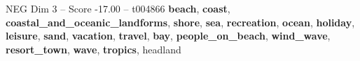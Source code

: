 \begin{textsample}{NEG Dim 3 – Score -17.00 – t004866}  \label{ex:f3_neg_020}
\textbf{beach}, \textbf{coast}, \textbf{coastal\_and\_oceanic\_landforms}, \textbf{shore}, \textbf{sea}, \textbf{recreation}, \textbf{ocean}, \textbf{holiday}, \textbf{leisure}, \textbf{sand}, \textbf{vacation}, \textbf{travel}, \textbf{bay}, \textbf{people\_on\_beach}, \textbf{wind\_wave}, \textbf{resort\_town}, \textbf{wave}, \textbf{tropics}, headland

\end{textsample}
